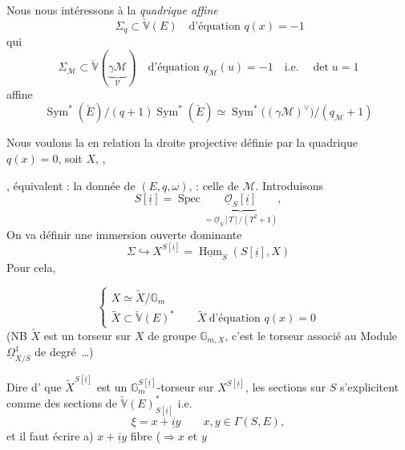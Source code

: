 \documentclass[11pt,a4paper]{article}
\begin{document}
Nous nous intéressons à la \emph{quadrique affine}
\[
\ \Sigma_q\subset\check{\mathbb{V}}(E)\quad\text{d'équation } q(x)=-1 \tag{10}
\]
qui  
\[
\Sigma_{\mathcal{M}}\subset\check{\mathbb{V}}(\underbrace{\gamma\mathcal{M}}_{\mathcal{V}})\quad\text{d'équation } q_{\mathcal{M}}(u)=-1\quad\text{i.e.}\quad \det u=1 \tag{11}
\]
\struck{\ill{}}  \ill{}  \ill{} affine
\[
\operatorname{Sym}^{*}(\check{E})/(q+1)\operatorname{Sym}^{*}(\check{E})\simeq\operatorname{Sym}^{*}\bigl((\gamma\mathcal{M})^{\vee}\bigr)/(q_{\mathcal{M}}+1) \tag{12}
\]

Nous voulons  la \ill{} en relation \ill{} la droite projective définie par la quadrique $q(x)=0$, soit $X$, \struck{\ill{}}    ,

, équivalent : la donnée de $(E,q,\omega)$, \ill{} \ill{} : celle de $\mathcal{M}$. Introduisons
\[
S[\underline{i}]=\operatorname{Spec}\underbrace{\underline{\mathcal{O}}_S[\underline{i}]}_{=\underline{\mathcal{O}}_S[T]/(T^2+1)}, \tag{13}
\]
On va définir une immersion ouverte dominante
\[
\Sigma\hookrightarrow X^{S[\underline{i}]}=\underline{\operatorname{Hom}}_S(S[\underline{i}],X) \tag{14}
\]
Pour cela,  

\[
\begin{cases}
X\simeq\widetilde{X}/\mathbb{G}_m \\
\widetilde{X}\subset\check{\mathbb{V}}(E)^{*}\qquad \widetilde{X}\ \text{d'équation } q(x)=0
\end{cases} \tag{15}
\]
(NB $\widetilde{X}$ est un torseur sur $X$ de groupe $\mathbb{G}_{m,X}$, c'est le torseur associé au Module $\underline{\Omega}^1_{X/S}$ de degré \,…)

Dire d'\ill{} \ill{} \ill{} que $\widetilde{X}^{S[\underline{i}]}$ \struck{\ill{}} est un $\mathbb{G}_m^{S[\underline{i}]}$-torseur sur $X^{S[\underline{i}]}$, \ill{} les sections  sur $S$ s'explicitent comme des sections de $\check{\mathbb{V}}(E)^{*}_{S[\underline{i}]}$ i.e.\  
\[
\xi=x+\underline{i}y\qquad x,y\in\Gamma(S,E),
\]
et il faut écrire
a) $x+\underline{i}y$   \ill{} fibre ($\Rightarrow x$ et $y$ \ill{}
\end{document}
